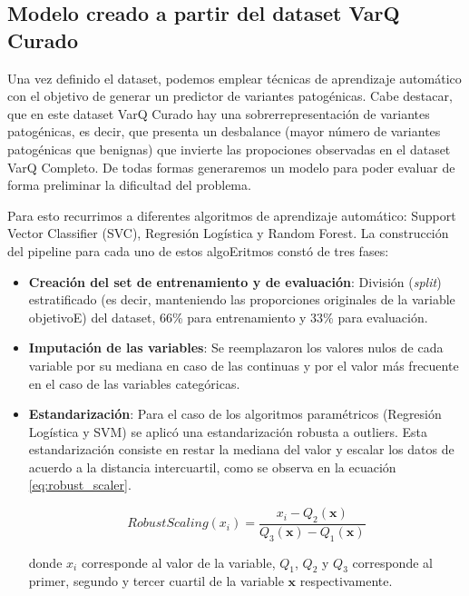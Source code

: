 
\subsection{Modelo creado a partir del dataset VarQ Curado}

Una vez definido el dataset, podemos emplear técnicas de aprendizaje automático con el objetivo de generar un predictor de variantes patogénicas. Cabe destacar, que en este dataset VarQ Curado hay una sobrerrepresentación de variantes patogénicas, es decir, que presenta un desbalance (mayor número de variantes patogénicas que benignas) que invierte las propociones observadas en el dataset VarQ Completo. De todas formas generaremos un modelo para poder evaluar de forma preliminar la dificultad del problema. 

Para esto recurrimos a diferentes algoritmos de aprendizaje automático: Support Vector Classifier (SVC), Regresión Logística y Random Forest. La construcción del pipeline para cada uno de estos algoEritmos constó de tres fases: 

\begin{itemize}
    \item \textbf{Creación del set de entrenamiento y de evaluación}: División (\textit{split}) estratificado (es decir, manteniendo las proporciones originales de la variable objetivoE) del dataset, 66\% para entrenamiento y 33\% para evaluación. 
    \item \textbf{Imputación de las variables}: Se reemplazaron los valores nulos de cada variable por su mediana en caso de las continuas y por el valor más frecuente en el caso de las variables categóricas.
    \item \textbf{Estandarización}: Para el caso de los algoritmos paramétricos (Regresión Logística y SVM) se aplicó una estandarización robusta a outliers. Esta estandarización consiste en restar la mediana del valor y escalar los datos de acuerdo a la distancia intercuartil, como se observa en la ecuación \ref{eq:robust_scaler}.
    
    \begin{equation}
        RobustScaling(x_i) = \frac{x_i - Q_2(\textbf{x})}{Q_3(\textbf{x}) - Q_1(\textbf{x})} 
        \label{eq:robust_scaler}
    \end{equation}
    
    donde $x_i$ corresponde al valor de la variable,  $Q_1$, $Q_2$ y $Q_3$ corresponde al primer, segundo y tercer cuartil de la variable $\textbf{x}$ respectivamente.
    
    
\end{itemize}

